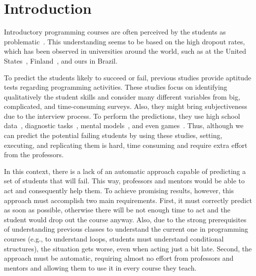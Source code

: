 
\section{Introduction}

Introductory programming courses are often perceived by the students as problematic~\cite{yadin-inroads-acm-11}. This understanding seems to be based on the high dropout rates, which has been observed in universities around the world, such as at the United States~\cite{bennedsen-sigcse-failure-rates-2007}, Finland~\cite{why-dropout-icer06}, and ours in Brazil.

To predict the students likely to succeed or fail, previous studies provide aptitude tests regarding programming activities. These studies focus on identifying qualitatively the student skills and consider many different variables from big, complicated, and time-consuming surveys. Also, they might bring subjectiveness due to the interview process. To perform the predictions, they use high school data~\cite{butcher-predictor-high-school-1985}, diagnostic tasks~\cite{simon-predictors-ace2006}, mental models~\cite{camel-2006}, and even games~\cite{lorenzenC06-mastermind-predictor-sigcse2008}. Thus, although we can predict the potential failing students by using these studies, setting, executing, and replicating them is hard, time consuming and require extra effort from the professors. 

In this context, there is a lack of an automatic approach capable of predicting a set of students that will fail. This way, professors and mentors would be able to act and consequently help them. To achieve promising results, however, this approach must accomplish two main requirements. First, it must correctly predict as soon as possible, otherwise there will be not enough time to act and the student would drop out the course anyway. Also, due to the strong prerequisites of understanding previous classes to understand the current one in programming courses (e.g., to understand loops, students must understand conditional structures), the situation gets worse, even when acting just a bit late. Second, the approach must be automatic, requiring almost no effort from professors and mentors and allowing them to use it in every course they teach.



